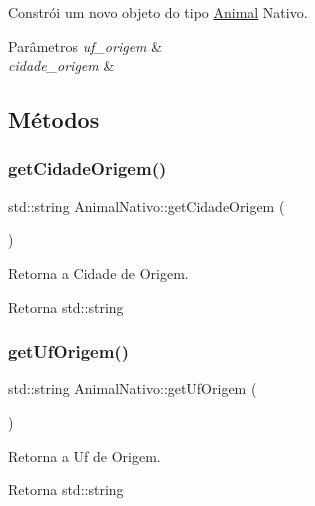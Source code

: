 Constrói um novo objeto do tipo \hyperlink{classAnimal}{Animal} Nativo. 


\begin{DoxyParams}{Parâmetros}
{\em uf\+\_\+origem} & \\
\hline
{\em cidade\+\_\+origem} & \\
\hline
\end{DoxyParams}


\subsection{Métodos}
\mbox{\label{classAnimalNativo_a7f4d471d82fc83b9d76d2bea01127022}} 
\subsubsection{\texorpdfstring{get\+Cidade\+Origem()}{getCidadeOrigem()}}
{\footnotesize\ttfamily std\+::string Animal\+Nativo\+::get\+Cidade\+Origem (\begin{DoxyParamCaption}{ }\end{DoxyParamCaption})}



Retorna a Cidade de Origem. 

\begin{DoxyReturn}{Retorna}
std\+::string 
\end{DoxyReturn}
\mbox{\label{classAnimalNativo_a4adb947e6542cdb4ac9be98cbe2450d7}} 
\subsubsection{\texorpdfstring{get\+Uf\+Origem()}{getUfOrigem()}}
{\footnotesize\ttfamily std\+::string Animal\+Nativo\+::get\+Uf\+Origem (\begin{DoxyParamCaption}{ }\end{DoxyParamCaption})}



Retorna a Uf de Origem. 

\begin{DoxyReturn}{Retorna}
std\+::string 
\end{DoxyReturn}
\mbox{\label{classAnimalNativo_af28524ef3ada1b047d722e0e969d5cab}} 
